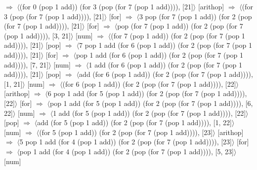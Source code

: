 \documentclass[12pt]{report}
\begin{document}
$\Rightarrow$ $\langle$(for 0 (pop 1 add)) (for 3 (pop (for 7 (pop 1 add)))), [21]$\rangle$ \hfill [arithop] \newline
$\Rightarrow$ $\langle$(for 3 (pop (for 7 (pop 1 add)))), [21]$\rangle$ \hfill [for] \newline
$\Rightarrow$ $\langle$3 pop (for 7 (pop 1 add)) (for 2 (pop (for 7 (pop 1 add)))), [21]$\rangle$ \hfill [for] \newline
$\Rightarrow$ $\langle$pop (for 7 (pop 1 add)) (for 2 (pop (for 7 (pop 1 add)))), [3, 21]$\rangle$ \hfill [num] \newline
$\Rightarrow$ $\langle$(for 7 (pop 1 add)) (for 2 (pop (for 7 (pop 1 add)))), [21]$\rangle$ \hfill [pop] \newline
$\Rightarrow$ $\langle$7 pop 1 add (for 6 (pop 1 add)) (for 2 (pop (for 7 (pop 1 add)))), [21]$\rangle$ \hfill [for] \newline
$\Rightarrow$ $\langle$pop 1 add (for 6 (pop 1 add)) (for 2 (pop (for 7 (pop 1 add)))), [7, 21]$\rangle$ \hfill [num] \newline
$\Rightarrow$ $\langle$1 add (for 6 (pop 1 add)) (for 2 (pop (for 7 (pop 1 add)))), [21]$\rangle$ \hfill [pop] \newline
$\Rightarrow$ $\langle$add (for 6 (pop 1 add)) (for 2 (pop (for 7 (pop 1 add)))), [1, 21]$\rangle$ \hfill [num] \newline
$\Rightarrow$ $\langle$(for 6 (pop 1 add)) (for 2 (pop (for 7 (pop 1 add)))), [22]$\rangle$ \hfill [arithop] \newline
$\Rightarrow$ $\langle$6 pop 1 add (for 5 (pop 1 add)) (for 2 (pop (for 7 (pop 1 add)))), [22]$\rangle$ \hfill [for] \newline
$\Rightarrow$ $\langle$pop 1 add (for 5 (pop 1 add)) (for 2 (pop (for 7 (pop 1 add)))), [6, 22]$\rangle$ \hfill [num] \newline
$\Rightarrow$ $\langle$1 add (for 5 (pop 1 add)) (for 2 (pop (for 7 (pop 1 add)))), [22]$\rangle$ \hfill [pop] \newline
$\Rightarrow$ $\langle$add (for 5 (pop 1 add)) (for 2 (pop (for 7 (pop 1 add)))), [1, 22]$\rangle$ \hfill [num] \newline
$\Rightarrow$ $\langle$(for 5 (pop 1 add)) (for 2 (pop (for 7 (pop 1 add)))), [23]$\rangle$ \hfill [arithop] \newline
$\Rightarrow$ $\langle$5 pop 1 add (for 4 (pop 1 add)) (for 2 (pop (for 7 (pop 1 add)))), [23]$\rangle$ \hfill [for] \newline
$\Rightarrow$ $\langle$pop 1 add (for 4 (pop 1 add)) (for 2 (pop (for 7 (pop 1 add)))), [5, 23]$\rangle$ \hfill [num] \newline
\end{document}
